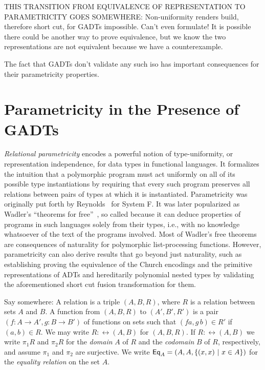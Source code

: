 \documentclass[acmsmall,screen,review,anonymous]{acmart}
\theoremstyle{definition}
\begin{document}
{\color{blue} THIS TRANSITION FROM EQUIVALENCE OF REPRESENTATION TO
  PARAMETRICITY GOES SOMEWHERE:
Non-uniformity renders build, therefore short cut, for GADTs
impossible. Can't even formulate! It is possible there could be
another way to prove equivalence, but we know the two representations
are not equivalent because we have a counterexample.

The fact that GADTs don't validate any such iso has important
consequences for their parametricity properties.}


\section{Parametricity in the Presence of GADTs}

{\em Relational parametricity} encodes a powerful notion of
type-uniformity, or representation independence, for data types in
functional languages. It formalizes the intuition that a polymorphic
program must act uniformly on all of its possible type instantiations
by requiring that every such program preserves all relations between
pairs of types at which it is instantiated. Parametricity was
originally put forth by Reynolds~\cite{rey83} for System F. It was
later popularized as Wadler's ``theorems for free''~\cite{wad89}, so
called because it can deduce properties of programs in such languages
solely from their types, i.e., with no knowledge whatsoever of the
text of the programs involved.  Most of Wadler's free theorems are
consequences of naturality for polymorphic list-processing
functions. However, parametricity can also derive results that go
beyond just naturality, such as establishing {\color{blue} proving}
the equivalence of the Church encodings and the primitive
representations of ADTs and {\color{blue} hereditarily polynomial}
nested types by validating the aforementioned short cut fusion
transformation for them.

{\color{blue} Say somewhere: A relation is a triple $(A,B,R)$, where
  $R$ is a relation between sets $A$ and $B$.  A function from
  $(A,B,R)$ to $(A',B',R')$ is a pair $(f : A \to A',g : B \to B')$ of
  functions on sets such that $(f a,g\,b) \in R'$ if $(a,b) \in R$. We
  may write $R : \rel(A,B)$ for $(A,B,R)$.  If $R : \rel(A,B)$ we
  write $\pi_1 R$ and $\pi_2 R$ for the {\em domain} $A$ of $R$ and
  the {\em codomain} $B$ of $R$, respectively, and assume $\pi_1$ and
  $\pi_2$ are surjective. We write $\mathsf{Eq}_A = (A,A,\{(x,x)~|~ x \in
  A\})$ for the {\em equality relation} on the set $A$.}
\end{document}
